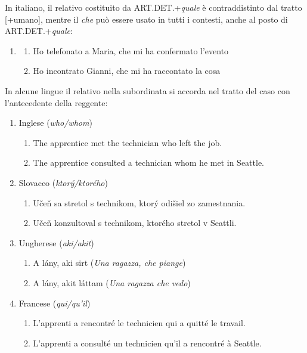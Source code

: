\documentclass[
  a4paper,
  twoside,
  11pt,
  chapterprefix=false,
  bibliography=totocnumbered,
  listof=flat]{scrbook}
\providecommand{\tightlist}{%
  \setlength{\itemsep}{0pt}\setlength{\parskip}{0pt}}
\begin{document}
In italiano, il relativo costituito da ART.DET.+\emph{quale} è contraddistinto dal tratto {[}+umano{]}, mentre il \emph{che} può essere usato in tutti i contesti, anche al posto di ART.DET.+\emph{quale}:

\begin{enumerate}
\def\labelenumi{(\arabic{enumi})}
\setcounter{enumi}{128}
\item
  \begin{enumerate}
  \def\labelenumii{\alph{enumii}.}
  \tightlist
  \item
    Ho telefonato a Maria, che mi ha confermato l'evento
  \item
    Ho incontrato Gianni, che mi ha raccontato la cosa
  \end{enumerate}
\end{enumerate}

In alcune lingue il relativo nella subordinata si accorda nel tratto del caso con l'antecedente della reggente:

\begin{enumerate}
\def\labelenumi{(\arabic{enumi})}
\setcounter{enumi}{129}
\tightlist
\item
  Inglese (\emph{who/whom})

  \begin{enumerate}
  \def\labelenumii{\alph{enumii}.}
  \tightlist
  \item
    The apprentice met the technician who left the job.
  \item
    The apprentice consulted a technician whom he met in Seattle.
  \end{enumerate}
\item
  Slovacco (\emph{ktorý/ktorého})

  \begin{enumerate}
  \def\labelenumii{\alph{enumii}.}
  \tightlist
  \item
    Učeň sa stretol s technikom, ktorý odišiel zo zamestnania.
  \item
    Učeň konzultoval s technikom, ktorého stretol v Seattli.
  \end{enumerate}
\item
  Ungherese (\emph{aki/akit})

  \begin{enumerate}
  \def\labelenumii{\alph{enumii}.}
  \tightlist
  \item
    A lány, aki sirt (\emph{Una ragazza, che piange})
  \item
    A lány, akit láttam (\emph{Una ragazza che vedo})
  \end{enumerate}
\item
  Francese (\emph{qui/qu'il})

  \begin{enumerate}
  \def\labelenumii{\alph{enumii}.}
  \tightlist
  \item
    L'apprenti a rencontré le technicien qui a quitté le travail.
  \item
    L'apprenti a consulté un technicien qu'il a rencontré à Seattle.
  \end{enumerate}
\end{enumerate}
\end{document}
